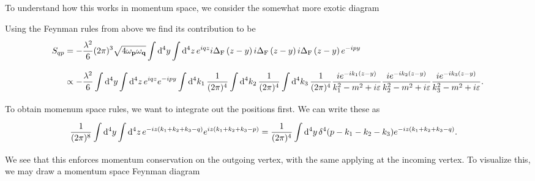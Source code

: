 To understand how this works in momentum space, we consider the somewhat more exotic diagram
\begin{center}
\end{center}
Using the Feynman rules from above we find its contribution to be
\begin{align*}
	S_{qp} &= -\frac{\lambda^{2}}{6}(2\pi)^{3}\sqrt{4\omega_{\vb{p}}\omega_{\vb{q}}}\int\limits_{}^{}\dd[4]{y}\int\limits_{}^{}\dd[4]{z}e^{iqz}i\Delta_{\text{F}}\left(z - y\right)i\Delta_{\text{F}}\left(z - y\right)i\Delta_{\text{F}}\left(z - y\right)e^{-ipy} \\
	       &\propto -\frac{\lambda^{2}}{6}\int\limits_{}^{}\dd[4]{y}\int\limits_{}^{}\dd[4]{z}e^{iqz}e^{-ipy}\int\limits_{}^{}\dd[4]{k_{1}}\frac{1}{(2\pi)^{4}}\int\limits_{}^{}\dd[4]{k_{2}}\frac{1}{(2\pi)^{4}}\int\limits_{}^{}\dd[4]{k_{3}}\frac{1}{(2\pi)^{4}}\frac{ie^{-ik_{1}(z - y)}}{k_{1}^{2} - m^{2} + i\varepsilon}\frac{ie^{-ik_{2}(z - y)}}{k_{2}^{2} - m^{2} + i\varepsilon}\frac{ie^{-ik_{3}(z - y)}}{k_{3}^{2} - m^{2} + i\varepsilon}.
\end{align*}
To obtain momenum space rules, we want to integrate out the positions first. We can write these as
\begin{align*}
	\frac{1}{(2\pi)^{8}}\int\limits_{}^{}\dd[4]{y}\int\limits_{}^{}\dd[4]{z}e^{-iz(k_{1} + k_{2} + k_{3} - q)}e^{iz(k_{1} + k_{2} + k_{3} - p)} &= \frac{1}{(2\pi)^{4}}\int\limits_{}^{}\dd[4]{y}\delta^{4}(p - k_{1} - k_{2} - k_{3})e^{-iz(k_{1} + k_{2} + k_{3} - q)}.
\end{align*}
We see that this enforces momentum conservation on the outgoing vertex, with the same applying at the incoming vertex. To visualize this, we may draw a momentum space Feynman diagram
\begin{center}
\end{center}
